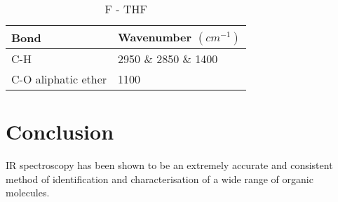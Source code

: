 \documentclass[a4paper, british]{article}
\begin{document}
\begin{table}[H]
    \centering
    \caption{F - THF}
    \vspace*{2mm}
    \label{tab:F}
    \begin{tabular}{ll}
        \toprule
        Bond                & Wavenumber \((cm^{-1})\)               \\ \midrule
        C-H                 & 2950 \& 2850 \& 1400 \\
        C-O aliphatic ether & 1100                 \\ \bottomrule
    \end{tabular}
\end{table}

\section{Conclusion}

IR spectroscopy has been shown to be an extremely accurate and consistent method of identification and characterisation of a wide range of organic molecules.

\newpage

\printbibliography
\end{document}
